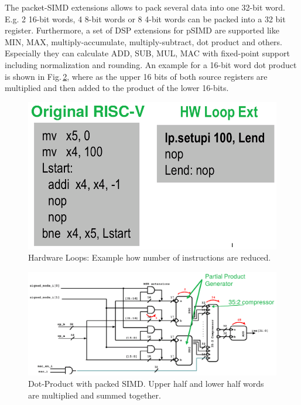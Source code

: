 The packet-SIMD extensions allows to pack several data into one 32-bit word. E.g. 2 16-bit words, 4 8-bit words or 8 4-bit words can be packed into a 32 bit register. Furthermore, a set of DSP extensions for pSIMD are supported like MIN, MAX, multiply-accumulate, multiply-subtract, dot product and others. Especially they can calculate ADD, SUB, MUL, MAC with fixed-point support including normalization and rounding. An example for a 16-bit word dot product is shown in Fig.\,\ref{fig:simd}, where as the upper 16 bits of both source registers are multiplied and then added to the product of the lower 16-bits.

\begin{figure}
    \centering
    \includegraphics[width=.4\textwidth]{figures/hwloops.png}
    \caption{Hardware Loops: Example how number of instructions are reduced.}
    \label{fig:hwloops}
\end{figure}

\begin{figure}
    \centering
    \includegraphics[width=\textwidth]{figures/simd.png}
    \caption{Dot-Product with packed SIMD. Upper half and lower half words are multiplied and summed together.}
    \label{fig:simd}
\end{figure}


